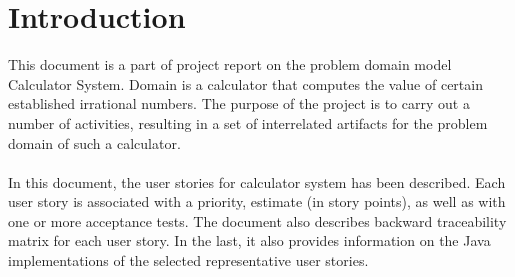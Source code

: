 \section{Introduction}

This document is a part of project report on the problem domain model Calculator System. Domain is a calculator that computes the value of certain established irrational numbers. The purpose of the project is to carry out a number of activities, resulting in a set of interrelated artifacts for the problem domain of such a calculator.\\ \\
In this document, the user stories for calculator system has been described. Each user story is associated with a priority, estimate (in story points), as well as with one or more acceptance tests. The document also describes backward traceability matrix for each user story. In the last, it also provides information on the Java implementations of the selected representative user stories.
